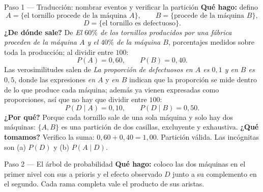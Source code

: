 \documentclass[11pt]{article}
\begin{document}
\begin{sol}

\begin{paso}{Paso 1 --- Traducción: nombrar eventos y verificar la partición}
\textbf{Qué hago:} defino
\[
A=\{\text{el tornillo procede de la máquina }A\},\qquad B=\{\text{procede de la máquina }B\},
\]
\[
D=\{\text{el tornillo es defectuoso}\}.
\]
\textbf{¿De dónde sale?} De \emph{El $60\%$ de los tornillos producidos por una fábrica proceden de la máquina $A$ y el $40\%$ de la máquina $B$}, porcentajes medidos sobre toda la producción; al dividir entre $100$:
\[
P(A)=0,60,\qquad P(B)=0,40 .
\]
Las verosimilitudes salen de \emph{La proporción de defectuosos en $A$ es $0,1$ y en $B$ es $0,5$}, donde las expresiones \emph{en $A$} y \emph{en $B$} indican que la proporción se mide dentro de lo que produce cada máquina; además ya vienen expresadas como proporciones, así que no hay que dividir entre $100$:
\[
P(D\mid A)=0,10,\qquad P(D\mid B)=0,50 .
\]
\textbf{¿Por qué?} Porque cada tornillo sale de una sola máquina y solo hay dos máquinas: $\{A,B\}$ es una partición de dos casillas, excluyente y exhaustiva.
\textbf{¿Qué tomamos?} Verifico la suma: $0,60+0,40=1,00$. Partición válida. Las incógnitas son (a) $P(D)$ y (b) $P(A\mid D)$.
\end{paso}

\begin{paso}{Paso 2 --- El árbol de probabilidad}
\textbf{Qué hago:} coloco las dos máquinas en el primer nivel con sus a prioris y el efecto observado $D$ junto a su complemento en el segundo. Cada rama completa vale el producto de sus aristas.

\begin{center}
\shorthandoff{<>}
\shorthandon{<>}
\end{center}


\end{paso}
\end{sol}
\end{document}
